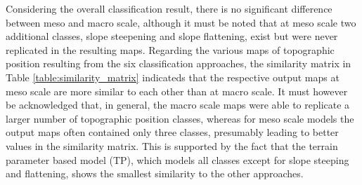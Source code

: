 \documentclass[preprint,12pt,authoryear]{elsarticle}
\begin{document}
Considering the overall classification result, there is no significant difference between meso and macro scale, although it must be noted that at meso scale two additional classes, slope steepening and slope flattening, exist but were never replicated in the resulting maps.
Regarding the various maps of topographic position resulting from the six classification approaches, the similarity matrix in Table \ref{table:similarity_matrix} indicateds that the respective output maps at meso scale are more similar to each other than at macro scale. It must however be acknowledged that, in general, the macro scale maps  were able to replicate a larger number of topographic position classes, whereas for meso scale models the output maps often contained only three classes, presumably leading to better values in the similarity matrix. This is supported by the fact that the terrain parameter based model (TP), which models all classes except for slope steeping and flattening, shows the smallest similarity to the other approaches.
\end{document}

